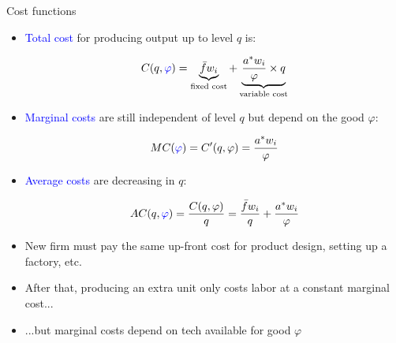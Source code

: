 \documentclass[notes,11pt, aspectratio=169, xcolor=table]{beamer}
\newcommand{\blue}[1]{\textcolor{blue}{#1}}
\begin{document}
\begin{frame}{Cost functions}

\begin{itemize}
    \item \blue{Total cost} for producing output up to level $q$ is:

    \begin{equation*}
        C(q,\blue{\varphi}) = \underbrace{\bar{f}w_i}
        _{\text{fixed cost}} + \underbrace{\frac{a^*w_i}{\varphi} \times q}_{\text{variable cost}}
    \end{equation*}

    \item<2-> \blue{Marginal costs} are still independent of level $q$ but depend on the good $\varphi$:

    \begin{equation*}
        MC(\blue{\varphi}) = C'(q,\varphi) = \frac{a^* w_i}{\varphi}
    \end{equation*}

    \item<3-> \blue{Average costs} are decreasing in $q$:

    \begin{equation*}
        AC(q,\blue{\varphi}) = \frac{C(q,\varphi)}{q} = \frac{\bar{f}w_i}{q} + \frac{a^*w_i}{\varphi}
    \end{equation*}    

    \item<4-> New firm must pay the same up-front cost for product design, setting up a factory, etc.
    
    \item<5-> After that, producing an extra unit only costs labor at a constant marginal cost...

    \item<6-> ...but marginal costs depend on tech available for good $\varphi$

    
\end{itemize}
    
\end{frame}
\end{document}
